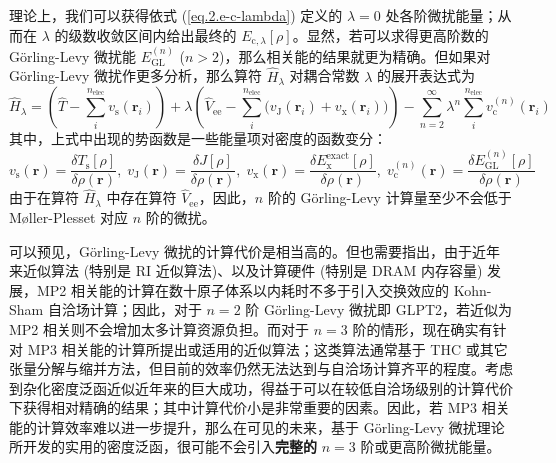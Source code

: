 理论上，我们可以获得依式 (\ref{eq.2.e-c-lambda}) 定义的 $\lambda=0$ 处各阶微扰能量；从而在 $\lambda$ 的级数收敛区间内给出最终的 $E_{\mathrm{c}, \lambda} [\rho]$。显然，若可以求得更高阶数的 G\"orling-Levy 微扰能 $E_\mathrm{GL}^{(n)}$ ($n > 2$)，那么相关能的结果就更为精确。但如果对 G\"orling-Levy 微扰作更多分析，那么算符 $\hat H_\lambda$ 对耦合常数 $\lambda$ 的展开表达式为
\begin{equation}
  \hat H_\lambda = \left( \hat T - \sum_i^{n_\mathrm{elec}} v_\mathrm{s} (\bm{r}_i) \right) + \lambda \left( \hat V_\mathrm{ee} - \sum_i^{n_\mathrm{elec}} \big( v_\mathrm{J} (\bm{r}_i) + v_\mathrm{x} (\bm{r}_i) \big) \right) - \sum_{n=2}^\infty \lambda^n \sum_{i}^{n_\mathrm{elec}} v_\mathrm{c}^{(n)} (\bm{r}_i)
\end{equation}
其中，上式中出现的势函数是一些能量项对密度的函数变分：
\begin{equation*}
  v_\mathrm{s} (\bm{r}) = \frac{\delta T_\mathrm{s} [\rho]}{\delta \rho(\bm{r})} , \;
  v_\mathrm{J} (\bm{r}) = \frac{\delta J [\rho]}{\delta \rho(\bm{r})}, \;
  v_\mathrm{x} (\bm{r}) = \frac{\delta E_\mathrm{x}^\mathrm{exact} [\rho]}{\delta \rho(\bm{r})}, \;
  v_\mathrm{c}^{(n)} (\bm{r}) = \frac{\delta E_\mathrm{GL}^{(n)} [\rho]}{\delta \rho (\bm{r})}
\end{equation*}
由于在算符 $\hat H_\lambda$ 中存在算符 $\hat V_\mathrm{ee}$，因此，$n$ 阶的 G\"orling-Levy 计算量至少不会低于 M\o{}ller-Plesset 对应 $n$ 阶的微扰。

可以预见，G\"orling-Levy 微扰的计算代价是相当高的。但也需要指出，由于近年来近似算法 (特别是 RI 近似算法)、以及计算硬件 (特别是 DRAM 内存容量) 发展，MP2 相关能的计算在数十原子体系以内耗时不多于引入交换效应的 Kohn-Sham 自洽场计算；因此，对于 $n = 2$ 阶 G\"orling-Levy 微扰即 GLPT2，若近似为 MP2 相关则不会增加太多计算资源负担。而对于 $n = 3$ 阶的情形，现在确实有针对 MP3 相关能的计算所提出或适用的近似算法；这类算法通常基于 THC 或其它张量分解与缩并方法\cite{Hohenstein-Martinez.JCP.2012, Parrish-Sherrill.JCP.2012, Lee-Head-Gordon.JCTC.2020, Matthews-Matthews.JCTC.2020}，但目前的效率仍然无法达到与自洽场计算齐平的程度\cite{Matthews-Matthews.JCP.2021}。考虑到杂化密度泛函近似近年来的巨大成功，得益于可以在较低自洽场级别的计算代价下获得相对精确的结果；其中计算代价小是非常重要的因素。因此，若 MP3 相关能的计算效率难以进一步提升，那么在可见的未来，基于 G\"orling-Levy 微扰理论所开发的实用的密度泛函，很可能不会引入\textbf{完整的} $n = 3$ 阶或更高阶微扰能量。

